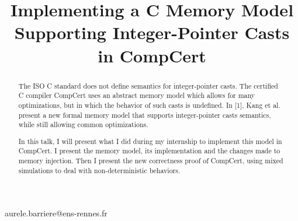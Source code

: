\documentclass[nocopyrightspace]{sigplanconf}
\begin{document}
\setlength{\pdfpageheight}{\paperheight}
\setlength{\pdfpagewidth}{\paperwidth}






\title{Implementing a C Memory Model Supporting Integer-Pointer Casts in CompCert}

	{}
           {aurele.barriere@ens-rennes.fr}

\maketitle





\begin{abstract}

The ISO C standard does not define semantics for integer-pointer casts. The certified C compiler CompCert uses an abstract memory model which allows for many optimizations, but in which the behavior of such casts is undefined. In [1], Kang et al. present a new formal memory model that supports integer-pointer casts semantics, while still allowing common optimizations.

In this talk, I will present what I did during my internship to implement this model in CompCert.
I present the memory model, its implementation and the changes made to memory injection.
Then I present the new correctness proof of CompCert, using mixed simulations to deal with non-deterministic behaviors.
 
\end{abstract}
\end{document}
